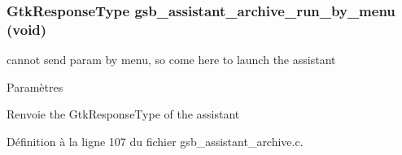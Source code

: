 \subsubsection[{gsb\_\-assistant\_\-archive\_\-run\_\-by\_\-menu}]{\setlength{\rightskip}{0pt plus 5cm}GtkResponseType gsb\_\-assistant\_\-archive\_\-run\_\-by\_\-menu (void)}\label{gsb__assistant__archive_8h_a57e51811453ac3de14dd07bfa3b752e2}
cannot send param by menu, so come here to launch the assistant


\begin{DoxyParams}{Paramètres}
\item[{\em }]\end{DoxyParams}
\begin{DoxyReturn}{Renvoie}
the GtkResponseType of the assistant 
\end{DoxyReturn}


Définition à la ligne 107 du fichier gsb\_\-assistant\_\-archive.c.

